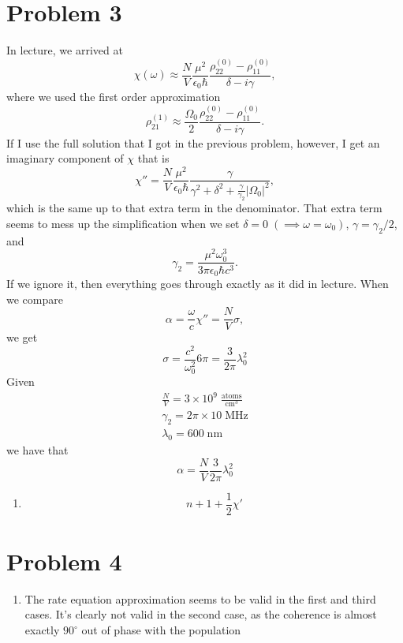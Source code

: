 \documentclass[12pt]{article}
\newcommand{\magsq}[1]{\big|#1\big|^2}
\begin{document}
\section*{Problem 3}
In lecture, we arrived at
\[ \chi(\omega) \approx \frac{N}{V}\frac{\mu^2}{\epsilon_0\hbar}\frac{\rho_{22}^{(0)} - \rho_{11}^{(0)}}{\delta - i \gamma}, \]
where we used the first order approximation 
\[ \rho_{21}^{(1)} \approx \frac{\Omega_0}{2}\frac{\rho_{22}^{(0)}-\rho_{11}^{(0)}}{\delta - i\gamma}. \]
If I use the full solution that I got in the previous problem, however, I get an imaginary component of $\chi$ that is
\[ \chi'' = \frac{N}{V}\frac{\mu^2}{\epsilon_0\hbar}\frac{\gamma}{\gamma^2 + \delta^2 + \frac{\gamma}{\gamma_2}\magsq{\Omega_0}}, \]
which is the same up to that extra term in the denominator. That extra term seems to mess up the simplification when we set $\delta =0\;(\implies \omega = \omega_0)$, $\gamma = \gamma_2/2$, and
\[ \gamma_2 = \frac{\mu^2\omega_0^3}{3\pi \epsilon_0\hbar c^3}. \]
If we ignore it, then everything goes through exactly as it did in lecture. When we compare 
\[ \alpha = \frac{\omega}{c}\chi'' = \frac{N}{V}\sigma, \]
we get
\[ \sigma = \frac{c^2}{\omega_0^2}6\pi = \frac{3}{2\pi}\lambda_0^2 \]
Given
\begin{align*}
    \frac{N}{V} = 3\times10^9\;\frac{\text{atoms}}{\text{cm}^3} \\
    \gamma_2 = 2\pi\times10\;\text{MHz} \\
    \lambda_0 = 600\;\text{nm}
\end{align*}
we have that 
\[ \alpha = \frac{N}{V}\frac{3}{2\pi}\lambda_0^2 \]
\begin{enumerate}[label=(\alph*)]
    \item \[ n + 1 + \frac{1}{2}\chi' \]
\end{enumerate}

\section*{Problem 4}
\begin{enumerate}[label=(\alph*)]
    \item The rate equation approximation seems to be valid in the first and third cases.
    It's clearly not valid in the second case, as the coherence is almost exactly $90^\circ$ out of phase with the population
\end{enumerate}


\end{document}
